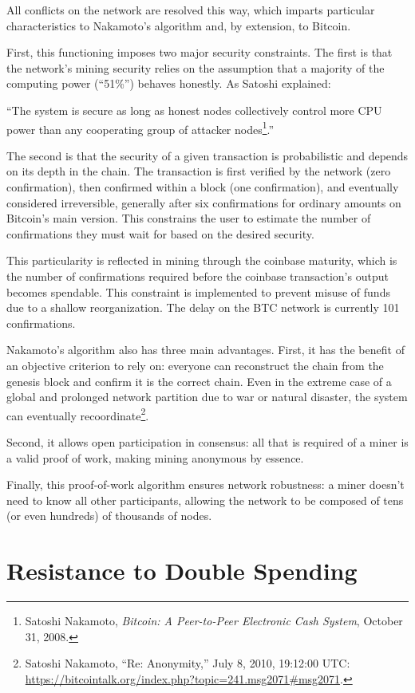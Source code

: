 \documentclass[
  a5paper,
  smalldemyvopaper,10pt,twoside,onecolumn,openright,extrafontsizes,hidelinks]{memoir}
\begin{document}
All conflicts on the network are resolved this way, which imparts
particular characteristics to Nakamoto's algorithm and, by extension, to
Bitcoin.

First, this functioning imposes two major security constraints. The
first is that the network's mining security relies on the assumption
that a majority of the computing power (``51\%'') behaves honestly. As
Satoshi explained:

``The system is secure as long as honest nodes collectively control more
CPU power than any cooperating group of attacker nodes\footnote{Satoshi
  Nakamoto, \emph{Bitcoin: A Peer-to-Peer Electronic Cash System},
  October 31, 2008.}.''

The second is that the security of a given transaction is probabilistic
and depends on its depth in the chain. The transaction is first verified
by the network (zero confirmation), then confirmed within a block (one
confirmation), and eventually considered irreversible, generally after
six confirmations for ordinary amounts on Bitcoin's main version. This
constrains the user to estimate the number of confirmations they must
wait for based on the desired security.

This particularity is reflected in mining through the coinbase maturity,
which is the number of confirmations required before the coinbase
transaction's output becomes spendable. This constraint is implemented
to prevent misuse of funds due to a shallow reorganization. The delay on
the BTC network is currently 101 confirmations.

Nakamoto's algorithm also has three main advantages. First, it has the
benefit of an objective criterion to rely on: everyone can reconstruct
the chain from the genesis block and confirm it is the correct chain.
Even in the extreme case of a global and prolonged network partition due
to war or natural disaster, the system can eventually
recoordinate\footnote{Satoshi Nakamoto, ``Re: Anonymity,'' July 8, 2010,
  19:12:00 UTC:
  \url{https://bitcointalk.org/index.php?topic=241.msg2071\#msg2071}.}.

Second, it allows open participation in consensus: all that is required
of a miner is a valid proof of work, making mining anonymous by essence.

Finally, this proof-of-work algorithm ensures network robustness: a
miner doesn't need to know all other participants, allowing the network
to be composed of tens (or even hundreds) of thousands of nodes.

\section*{Resistance to Double
Spending}\label{la-ruxe9sistance-uxe0-la-double-duxe9pense}
\end{document}
